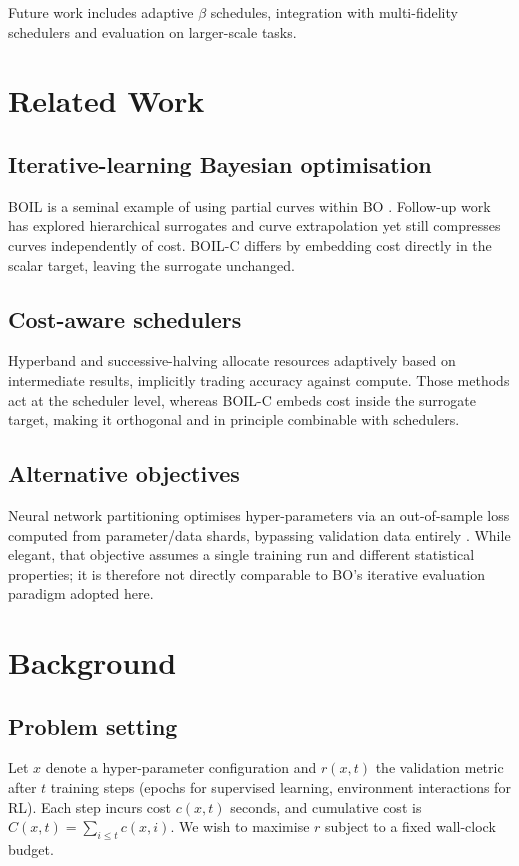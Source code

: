\documentclass{article} %
\begin{document}
Future work includes adaptive \(\beta\) schedules, integration with multi-fidelity schedulers and evaluation on larger-scale tasks.

\section{Related Work}
\label{sec:related}
\subsection{Iterative-learning Bayesian optimisation}
BOIL is a seminal example of using partial curves within BO \cite{nguyen-2019-bayesian}. Follow-up work has explored hierarchical surrogates and curve extrapolation yet still compresses curves independently of cost. BOIL-C differs by embedding cost directly in the scalar target, leaving the surrogate unchanged.

\subsection{Cost-aware schedulers}
Hyperband and successive-halving allocate resources adaptively based on intermediate results, implicitly trading accuracy against compute. Those methods act at the scheduler level, whereas BOIL-C embeds cost inside the surrogate target, making it orthogonal and in principle combinable with schedulers.

\subsection{Alternative objectives}
Neural network partitioning optimises hyper-parameters via an out-of-sample loss computed from parameter/data shards, bypassing validation data entirely \cite{mlodozeniec-2023-hyperparameter}. While elegant, that objective assumes a single training run and different statistical properties; it is therefore not directly comparable to BO's iterative evaluation paradigm adopted here.

\section{Background}
\label{sec:background}
\subsection{Problem setting}
Let \(x\) denote a hyper-parameter configuration and \(r(x,t)\) the validation metric after \(t\) training steps (epochs for supervised learning, environment interactions for RL). Each step incurs cost \(c(x,t)\) seconds, and cumulative cost is \(C(x,t) = \sum_{i\le t} c(x,i)\). We wish to maximise \(r\) subject to a fixed wall-clock budget.
\end{document}
